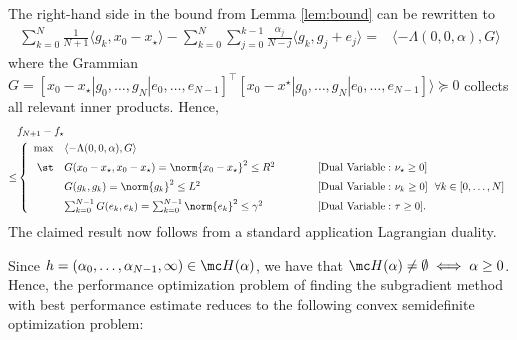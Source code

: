 \documentclass{article}
\begin{document}
\begin{appendixproof}[Proof of Theorem \ref{thm:main-upper-bound}.]
    The right-hand side in the bound from Lemma \ref{lem:bound} can be rewritten to
    \begin{align*}
      \sum_{k=0}^N \frac{1}{N+1} \langle g_k , x_0 - x_\star \rangle - \sum_{k=0}^N \sum_{j=0}^{k-1} \frac{\alpha_j}{N-j} \langle g_k, g_j+e_j\rangle = &  \langle -\Lambda(0, 0, \alpha), G\rangle
    \end{align*}
    where the Grammian $G = [x_0-x_\star| g_0, \dots, g_{N}| e_0,\dots, e_{N-1}]^\top [x_0-x^\star| g_0, \dots, g_{N}| e_0,\dots, e_{N-1}]\rangle\succeq 0$ collects all relevant inner products. Hence,
    \begin{align*}
      & f_{N+1} - f_\star\\
      \leq & \left\{
             \begin{array}{rl@{\hspace{4em}}l}
               \max & \multicolumn{2}{l}{\langle -\Lambda(0, 0, \alpha), G \rangle} \\[0.5em]
               \st & G(x_0-x_\star, x_0-x_\star) = \norm{x_0-x_\star}^2 \leq R^2 & [{\rm{Dual~Variable:}}~ \nu_\star\geq 0]\\[0.5em]
                    & G(g_k, g_k) = \norm{g_{k}}^2\leq L^2 & [{\rm{Dual~Variable:}}~ \nu_k\geq 0] ~~\forall k\in [0, \dots, N]\\[0.5em]
                    & \sum_{k=0}^{N-1}  G(e_k, e_k) = \sum_{k=0}^{N-1} \norm{e_{k}}^2\leq \gamma^2& [{\rm{Dual~Variable:}}~ \tau\geq 0].
             \end{array}\right.
    \end{align*}
    The claimed result now follows from a standard application Lagrangian duality. %
  \end{appendixproof}
Since $h=(\alpha_0, \dots, \alpha_{N-1}, \infty) \in \mc H(\alpha)$, we have that $\mc H(\alpha)\neq \emptyset \iff \alpha\geq 0$. Hence, the performance optimization problem of finding the subgradient method with best performance estimate reduces to the following convex semidefinite optimization problem:
\end{document}
